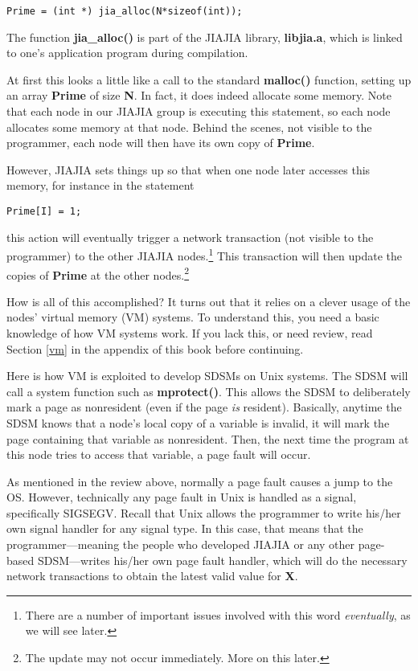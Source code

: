 \begin{Verbatim}[fontsize=\relsize{-2}]
Prime = (int *) jia_alloc(N*sizeof(int));
\end{Verbatim}

The function {\bf jia\_alloc()} is part of the JIAJIA library, {\bf
libjia.a}, which is linked to one's application program during
compilation.

At first this looks a little like a call to the standard {\bf malloc()}
function, setting up an array {\bf Prime} of size {\bf N}.  In fact, it
does indeed allocate some memory.  Note that each node in our JIAJIA
group is executing this statement, so each node allocates some memory at
that node.  Behind the scenes, not visible to the programmer, each node
will then have its own copy of {\bf Prime}.

However, JIAJIA sets things up so that when one node later accesses this
memory, for instance in the statement

\begin{Verbatim}[fontsize=\relsize{-2}]
Prime[I] = 1;
\end{Verbatim}

this action will eventually trigger a network transaction (not visible
to the programmer) to the other JIAJIA nodes.\footnote{There are a
number of important issues involved with this word {\it eventually}, as
we will see later.} This transaction will then update the copies of {\bf
Prime} at the other nodes.\footnote{The update may not occur
immediately.  More on this later.}

How is all of this accomplished?  It turns out that it relies on a
clever usage of the nodes' virtual memory (VM) systems.  To understand
this, you need a basic knowledge of how VM systems work.  If you lack
this, or need review, read Section \ref{vm} in the appendix of this book
before continuing.

Here is how VM is exploited to develop SDSMs on Unix systems.  The
SDSM will call a system function such as {\bf mprotect()}.  This allows
the SDSM to deliberately mark a page as nonresident (even if the
page {\it is} resident).  Basically, anytime the SDSM knows that a
node's local copy of a variable is invalid, it will mark the page
containing that variable as nonresident.  Then, the next time the
program at this node tries to access that variable, a page fault will
occur.

As mentioned in the review above, normally a page fault causes a jump to
the OS.  However, technically any page fault in Unix is handled as a
signal, specifically SIGSEGV.  Recall that Unix allows the programmer to
write his/her own signal handler for any signal type.  In this case,
that means that the programmer---meaning the people who developed JIAJIA
or any other page-based SDSM---writes his/her own page fault handler,
which will do the necessary network transactions to obtain the latest
valid value for {\bf X}.

